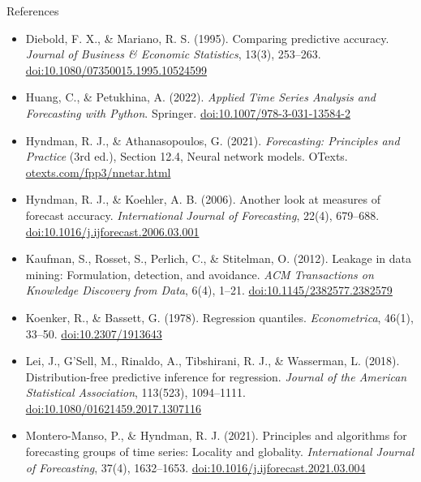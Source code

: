 \begin{frame}{References}
\itemsize{\tiny}
\begin{itemize}
    \item Diebold, F. X., \& Mariano, R. S. (1995). Comparing predictive accuracy. \textit{Journal of Business \& Economic Statistics}, 13(3), 253--263. \href{https://doi.org/10.1080/07350015.1995.10524599}{doi:10.1080/07350015.1995.10524599}
    \item Huang, C., \& Petukhina, A. (2022). \textit{Applied Time Series Analysis and Forecasting with Python}. Springer. \href{https://doi.org/10.1007/978-3-031-13584-2}{doi:10.1007/978-3-031-13584-2}
    \item Hyndman, R. J., \& Athanasopoulos, G. (2021). \textit{Forecasting: Principles and Practice} (3rd ed.), Section 12.4, Neural network models. OTexts. \href{https://otexts.com/fpp3/nnetar.html}{otexts.com/fpp3/nnetar.html}
    \item Hyndman, R. J., \& Koehler, A. B. (2006). Another look at measures of forecast accuracy. \textit{International Journal of Forecasting}, 22(4), 679--688. \href{https://doi.org/10.1016/j.ijforecast.2006.03.001}{doi:10.1016/j.ijforecast.2006.03.001}
    \item Kaufman, S., Rosset, S., Perlich, C., \& Stitelman, O. (2012). Leakage in data mining: Formulation, detection, and avoidance. \textit{ACM Transactions on Knowledge Discovery from Data}, 6(4), 1--21. \href{https://doi.org/10.1145/2382577.2382579}{doi:10.1145/2382577.2382579}
    \item Koenker, R., \& Bassett, G. (1978). Regression quantiles. \textit{Econometrica}, 46(1), 33--50. \href{https://doi.org/10.2307/1913643}{doi:10.2307/1913643}
    \item Lei, J., G'Sell, M., Rinaldo, A., Tibshirani, R. J., \& Wasserman, L. (2018). Distribution-free predictive inference for regression. \textit{Journal of the American Statistical Association}, 113(523), 1094--1111. \href{https://doi.org/10.1080/01621459.2017.1307116}{doi:10.1080/01621459.2017.1307116}
    \item Montero-Manso, P., \& Hyndman, R. J. (2021). Principles and algorithms for forecasting groups of time series: Locality and globality. \textit{International Journal of Forecasting}, 37(4), 1632--1653. \href{https://doi.org/10.1016/j.ijforecast.2021.03.004}{doi:10.1016/j.ijforecast.2021.03.004}
\end{itemize}
\end{frame}


